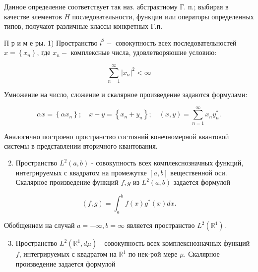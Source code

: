 \documentclass[10pt]{article}
\begin{document}
Данное определение соответствует так наз. абстрактному Г. п.; выбирая в качестве элементов $H$ последовательности, функции или операторы определенных типов, получают различные классы конкретных Г.п.



П р и м е ры. 1) Пространство $l^{2}-$ совокупность всех последовательностей $x=\left\{x_{n}\right\}$, где $x_{n}-$ комплексные числа, удовлетворяюшие условию:



\[

\sum_{n=1}^{\infty}\left|x_{n}\right|^{2}<\infty

\]



Умножение на число, сложение и скалярное произведение задаются формулами:



\[

\alpha x=\left\{\alpha x_{n}\right\} ; \quad x+y=\left\{x_{n}+y_{n}\right\} ; \quad(x, y)=\sum_{n=1}^{\infty} x_{n} y_{n}^{*} .

\]



Аналогично построено пространство состояний конечномерной квантовой системы в представлении вторичного квантования.



\begin{enumerate}

  \setcounter{enumi}{1}

  \item Пространство $L^{2}(a, b)$ - совокупность всех комплекснозначных функций, интегрируемых с квадратом на промежутке $[a, b]$ вещественной оси. Скалярное произведение функций $f, g$ из $L^{2}(a, b)$ задается формулой

\end{enumerate}



\[

(f, g)=\int_{a}^{b} f(x) g^{*}(x) d x .

\]



Обобщением на случай $a=-\infty, b=\infty$ является пространство $L^{2}\left(\mathbb{R}^{1}\right)$.



\begin{enumerate}

  \setcounter{enumi}{2}

  \item Пространство $L^{2}\left(\mathbb{R}^{1}, d \mu\right)$ - совокупность всех комплекснозначных функций $f$, интегрируемых с квадратом на $\mathbb{R}^{1}$ по нек-рой мере $\mu$. Скалярное произведение задается формулой

\end{enumerate}
\end{document}
